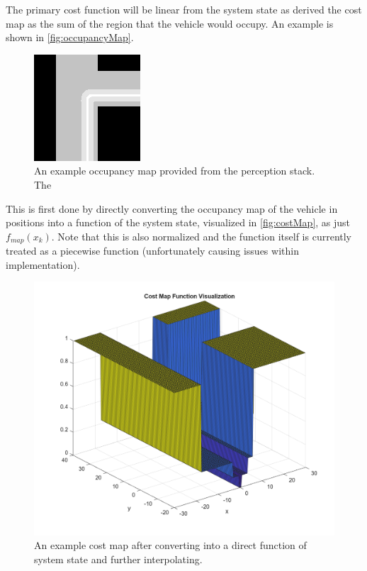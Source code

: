 \documentclass[]{IEEEtran}
\begin{document}
The primary cost function will be linear from the system state as derived the cost map as the sum of the region that the vehicle would occupy.
An example is shown in \autoref{fig:occupancyMap}.

\begin{figure}[h]
    \centering
    \includegraphics[width = 0.4\columnwidth]{figs/costmap1.png}
    \caption{An example occupancy map provided from the perception stack. The }\label{fig:occupancyMap}
\end{figure}

This is first done by directly converting the occupancy map of the vehicle in positions into a function of the system state, visualized in \autoref{fig:costMap}, as just $f_{map}(x_k)$.
Note that this is also normalized and the function itself is currently treated as a piecewise function (unfortunately causing issues within implementation).

\begin{figure}[h]
    \centering
    \includegraphics[width = 0.7 \columnwidth]{figs/surf_costmap1.png}
    \caption{An example cost map after converting into a direct function of system state and further interpolating.}\label{fig:costMap}
\end{figure}
\end{document}
